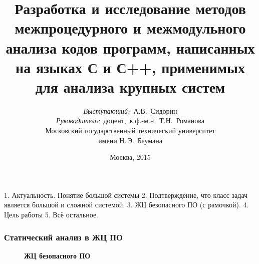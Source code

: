 \documentclass[hyperref={pdfpagelabels=false}]{beamer}
\title{\small{Разработка и  исследование методов межпроцедурного и межмодульного анализа кодов программ, написанных на языках  С и С++, применимых для анализа крупных систем}}
\author{\small{%
\emph{Выступающий:}~А.В.~Сидорин\\%
\emph{Руководитель:}~доцент,~к.ф.-м.н.~Т.Н.~Романова}\\%
\vspace{30pt}%
Московский государственный технический университет\\имени Н.\,Э.~Баумана%
\vspace{20pt}%
}
\date{\small{Москва, 2015}}
\begin{document}
\maketitle
1. Актуальность. Понятие большой системы
2. Подтверждение, что класс задач является большой и сложной системой.
3. ЖЦ безопасного ПО (с рамочкой).
4. Цель работы
5. Всё остальное.
\begin{frame}
\frametitle{Статический анализ в ЖЦ ПО}
\begin{figure}[h]
  \vfill
  \begin{minipage}[h]{\linewidth}
    \textbf{ЖЦ безопасного ПО}
  \end{minipage}
\end{figure}
\end{frame}
\end{document}
